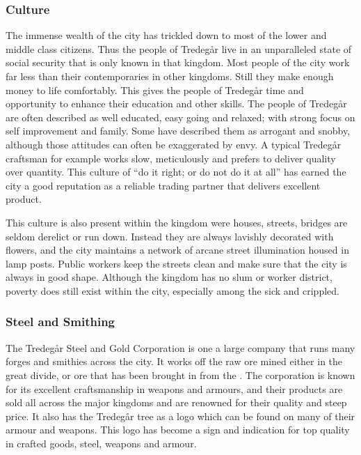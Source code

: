 \subsubsection{Culture}

The immense wealth of the city has trickled down to most of the lower and middle
class citizens. Thus the people of Tredegår live in an unparalleled state of
social security that is only known in that kingdom. Most people of the city
work far less than their contemporaries in other kingdoms. Still they make
enough money to life comfortably. This gives the people of Tredegår time and
opportunity to enhance their education and other skills. The people of Tredegår
are often described as well educated, easy going and relaxed; with strong focus
on self improvement and family. Some have described them as arrogant and snobby,
although those attitudes can often be exaggerated by envy. A typical Tredegår
craftsman for example works slow, meticulously and prefers to deliver quality
over quantity. This culture of ``do it right; or do not do it at all'' has
earned the city a good reputation as a reliable trading partner that delivers
excellent product.

This culture is also present within the kingdom were houses, streets, bridges
are seldom derelict or run down. Instead they are always lavishly decorated with
flowers, and the city maintains a network of arcane street illumination housed
in lamp posts. Public workers keep the streets clean and make sure that the
city is always in good shape. Although the kingdom has no slum or worker
district, poverty does still exist within the city, especially among the sick
and crippled.

\subsubsection{Steel and Smithing}

The Tredegår Steel and Gold Corporation is one a large company that
runs many forges and smithies across the city. It works off the raw ore mined
either in the great divide, or ore that has been brought in from the
. The corporation is known for its excellent
craftsmanship in weapons and armours, and their products are sold all across
the major kingdoms and are renowned for their quality and steep price. It also
has the Tredegår tree as a logo which can be found on many of their armour
and weapons. This logo has become a sign and indication for top quality in
crafted goods, steel, weapons and armour.

